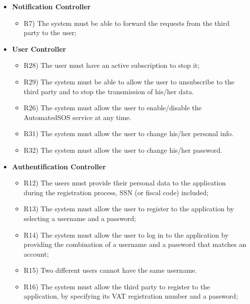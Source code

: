 \begin{itemize}
\begin{itemize}
		\end{itemize}
		\item \textbf{Notification Controller}
		\begin{itemize}
			\item R7) The system must be able to forward the requests from the third party to the user;\\
		\end{itemize}
		\item \textbf{User Controller}
		\begin{itemize}
			\item R28) The user must have an active subscription to stop it;\\
	 		\item R29) The system must be able to allow the user to unsubscribe to the third party and to stop the transmission of his/her data.\\
	 		\item R26) The system must allow the user to enable/disable the AutomatedSOS service at any time.\\
	 		\item R31) The system must allow the user to change his/her personal info.\\
			\item R32) The system must allow the user to change his/her password.\\
		\end{itemize}
		\item \textbf{Authentification Controller}
		\begin{itemize}
			\item R12) The users must provide their personal data to the application during the registration process, SSN (or fiscal code) included;\\
			\item R13) The system must allow the user to register to the application by selecting a username and a password;\\
			\item R14) The system must allow the user to log in to the application by providing the combination of a username and a password that matches an account;\\
			\item R15) Two different users cannot have the same username.\\
			\item R16) The system must allow the third party to register to the application, by specifying its VAT registration number and a password;\\

\end{itemize}
\end{itemize}
